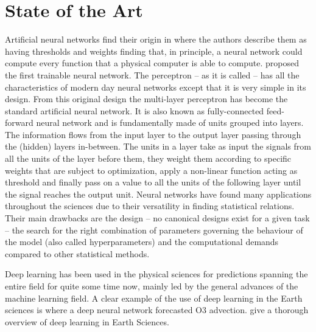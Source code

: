 \section{State of the Art}\label{1sec:2}
Artificial neural networks find their origin in \citet{McCulloch1943AActivity} where the authors describe them as having thresholds and weights finding that, in principle, a neural network could compute every function that a physical computer is able to compute. \citet{Rosenblatt1958TheBrain} proposed the first trainable neural network. The perceptron -- as it is called -- has all the characteristics of modern day neural networks except that it is very simple in its design. From this original design the multi-layer perceptron has become the standard artificial neural network. It is also known as fully-connected feed-forward neural network and is fundamentally made of units grouped into layers. The information flows from the input layer to the output layer passing through the (hidden) layers in-between. The units in a layer take as input the signals from all the units of the layer before them, they weight them according to specific weights that are subject to optimization, apply a non-linear function acting as threshold and finally pass on a value to all the units of the following layer until the signal reaches the output unit. Neural networks have found many applications throughout the sciences due to their versatility in finding statistical relations. Their main drawbacks are the design -- no canonical designs exist for a given task -- the search for the right combination of parameters governing the behaviour of the model (also called hyperparameters) and the computational demands compared to other statistical methods.

Deep learning has been used in the physical sciences for predictions spanning the entire field for quite some time now, mainly led by the general advances of the machine learning field. A clear example of the use of deep learning in the Earth sciences is \citet{Steffenel2021ForecastingExperiment} where a deep neural network forecasted O3 advection. \citet{Reichstein2019DeepScience} give a thorough overview of deep learning in Earth Sciences.


